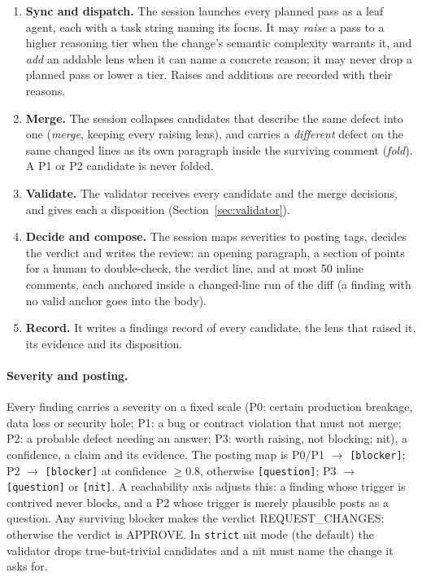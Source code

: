 \documentclass[11pt,a4paper]{article}
\newcommand{\code}[1]{\texttt{#1}}
\begin{document}
\begin{enumerate}
  \item \textbf{Sync and dispatch.} The session launches every planned pass
  as a leaf agent, each with a task string naming its focus. It may
  \emph{raise} a pass to a higher reasoning tier when the change's semantic
  complexity warrants it, and \emph{add} an addable lens when it can name a
  concrete reason; it may never drop a planned pass or lower a tier. Raises
  and additions are recorded with their reasons.
  \item \textbf{Merge.} The session collapses candidates that describe the
  same defect into one (\emph{merge}, keeping every raising lens), and
  carries a \emph{different} defect on the same changed lines as its own
  paragraph inside the surviving comment (\emph{fold}). A P1 or P2
  candidate is never folded.
  \item \textbf{Validate.} The validator receives every candidate and the
  merge decisions, and gives each a disposition (Section~\ref{sec:validator}).
  \item \textbf{Decide and compose.} The session maps severities to posting
  tags, decides the verdict and writes the review: an opening paragraph, a
  section of points for a human to double-check, the verdict line, and at
  most 50 inline comments, each anchored inside a changed-line run of the
  diff (a finding with no valid anchor goes into the body).
  \item \textbf{Record.} It writes a findings record of every candidate,
  the lens that raised it, its evidence and its disposition.
\end{enumerate}

\paragraph{Severity and posting.} Every finding carries a severity on a
fixed scale (P0: certain production breakage, data loss or security hole;
P1: a bug or contract violation that must not merge; P2: a probable defect
needing an answer; P3: worth raising, not blocking; nit), a confidence, a
claim and its evidence. The posting map is P0/P1 $\to$ \code{[blocker]};
P2 $\to$ \code{[blocker]} at confidence $\ge 0.8$, otherwise
\code{[question]}; P3 $\to$ \code{[question]} or \code{[nit]}. A
reachability axis adjusts this: a finding whose trigger is contrived never
blocks, and a P2 whose trigger is merely plausible posts as a question. Any
surviving blocker makes the verdict REQUEST\_CHANGES; otherwise the verdict
is APPROVE. In \code{strict} nit mode (the default) the validator drops
true-but-trivial candidates and a nit must name the change it asks for.
\end{document}
